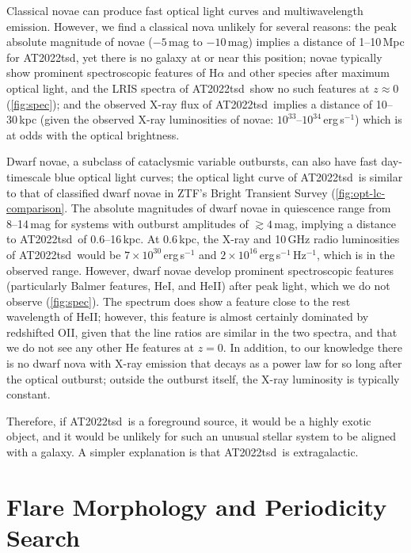 \documentclass{nature_plusfigure}
\newcommand{\at}{AT2022tsd}
\begin{document}
\begin{methods}
Classical novae can produce fast optical light curves and multiwavelength emission\cite{Chomiuk2021}. However, we find a classical nova unlikely for several reasons: the peak absolute magnitude of novae ($-5\,$mag to $-10\,$mag\cite{Chomiuk2021}) implies a distance of 1--10\,Mpc for \at, yet there is no galaxy at or near this position; novae typically show prominent spectroscopic features of H$\alpha$ and other species after maximum optical light\cite{Chomiuk2021}, and the LRIS spectra of \at\ show no such features at $z\approx0$ (\ref{fig:spec}); and the observed X-ray flux of \at\ implies a distance of 10--30\,kpc (given the observed X-ray luminosities\cite{Chomiuk2021} of novae: $10^{33}$--$10^{34}\,$erg\,s$^{-1}$) which is at odds with the optical brightness.

Dwarf novae, a subclass of cataclysmic variable outbursts, can also have fast day-timescale blue optical light curves; the optical light curve of \at\ is similar to that of classified dwarf novae in ZTF's Bright Transient Survey\cite{PerleyBTS} (\ref{fig:opt-lc-comparison}. The absolute magnitudes of dwarf novae in quiescence range from 8--14\,mag for systems with outburst amplitudes of $\gtrsim4\,$mag, implying a distance to \at\ of 0.6--16\,kpc. At 0.6\,kpc, the X-ray and 10\,GHz radio luminosities of \at\ would be $7\times10^{30}\,$erg\,s$^{-1}$ and $2\times10^{16}$\,erg\,s$^{-1}$\,Hz$^{-1}$, which is in the observed range\cite{Polzin2022,Coppejans2020_CV}. 
However, dwarf novae develop prominent spectroscopic features (particularly Balmer features, HeI, and HeII) after peak light\cite{Morales-Rueda2002,Han2020}, which we do not observe (\ref{fig:spec}). The spectrum does show a feature close to the rest wavelength of HeII; however, this feature is almost certainly dominated by redshifted OII, given that the line ratios are similar in the two spectra, and that we do not see any other He features at $z=0$.
In addition, to our knowledge there is no dwarf nova with X-ray emission that decays as a power law for so long after the optical outburst; outside the outburst itself, the X-ray luminosity is typically constant\cite{Fertig2011}.

Therefore, if \at\ is a foreground source, it would be a highly exotic object, and it would be unlikely for such an unusual stellar system to be aligned with a galaxy. A simpler explanation is that \at\ is extragalactic.

\section{Flare Morphology and Periodicity Search}
\label{sec:flare-morphology}


\end{methods}
\end{document}
